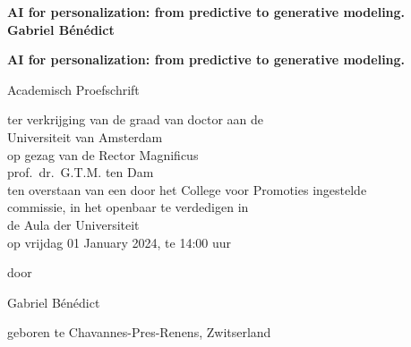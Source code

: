 
{\pagestyle{empty}
\newcommand{\printtitle}{%
{
\Huge\bf AI for personalization: from predictive to generative modeling.\\[0.8cm]
}}

\begin{titlepage}
\par\vskip 2cm
\begin{center}
\printtitle
\vfill
{\LARGE\bf Gabriel Bénédict}		%
\vskip 2cm
\end{center}
\end{titlepage}


\mbox{}\newpage
\setcounter{page}{1}


\clearpage
\par\vskip 2cm
\begin{center}
\printtitle
\par\vspace {4cm}
{\large \sc Academisch Proefschrift}
\par\vspace {1cm}
{\large ter verkrijging van de graad van doctor aan de \\
Universiteit van Amsterdam\\
op gezag van de Rector Magnificus\\
prof.\ dr.\ G.T.M. ten Dam\\
ten overstaan van een door het College voor Promoties ingestelde \\
commissie, in het openbaar te verdedigen in \\
de Aula der Universiteit\\
op vrijdag 01 January 2024, te 14:00 uur \\ } %
\par\vspace {1cm} {\large door}
\par \vspace {1cm}
{\Large Gabriel Bénédict}		%
\par\vspace {1cm}
{\large geboren te Chavannes-Pres-Renens, Zwitserland} 	%
\end{center}


}
